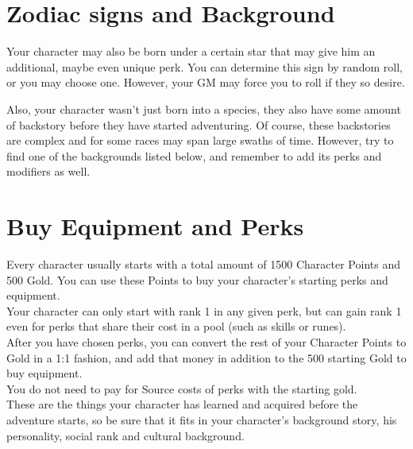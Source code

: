 \section{Zodiac signs and Background}\label{sec:charCreationBackgrounds}

Your character may also be born under a certain star that may give him an additional, maybe even unique perk.
You can determine this sign by random roll, or you may choose one.
However, your GM may force you to roll if they so desire.

Also, your character wasn't just born into a species, they also have some amount of backstory before they have started adventuring.
Of course, these backstories are complex and for some races may span large swaths of time.
However, try to find one of the backgrounds listed below, and remember to add its perks and modifiers as well.


\section{Buy Equipment and Perks}\label{sec:charCreationPerkAndEquip}

Every character usually starts with a total amount of 1500 Character Points and 500 Gold.
You can use these Points to buy your character's starting perks and equipment.\\
Your character can only start with rank 1 in any given perk, but can gain rank 1 even for perks that share their cost in a pool (such as skills or runes).\\
After you have chosen perks, you can convert the rest of your Character Points to Gold in a 1:1 fashion, and add that money in addition to the 500 starting Gold to buy equipment.\\
You do not need to pay for Source costs of perks with the starting gold.\\
These are the things your character has learned and acquired before the adventure starts, so be sure that it fits in your character's background story, his personality, social rank and cultural background.\\